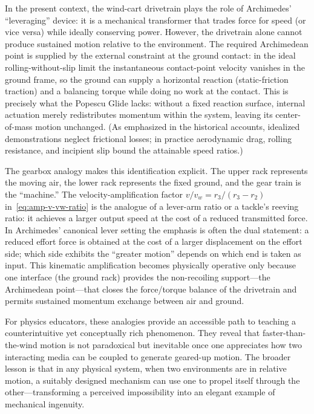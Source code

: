 \documentclass[reprint,aps,pra,longbibliography]{revtex4-2}
\begin{document}
In the present context, the wind-cart drivetrain plays the role of Archimedes'
``leveraging'' device: it is a mechanical transformer that trades force for
speed (or vice versa) while ideally conserving power. However, the drivetrain
alone cannot produce sustained motion relative to the environment. The required
Archimedean point is supplied by the external constraint at the ground contact:
in the ideal rolling-without-slip limit the instantaneous contact-point
velocity vanishes in the ground frame, so the ground can supply a horizontal
reaction (static-friction traction) and a balancing torque while doing no work
at the contact. This is precisely what the Popescu Glide lacks: without a fixed
reaction surface, internal actuation merely redistributes momentum within the
system, leaving its center-of-mass motion unchanged. (As emphasized in the
historical accounts, idealized demonstrations neglect frictional losses; in
practice aerodynamic drag, rolling resistance, and incipient slip bound the
attainable speed ratios.)

The gearbox analogy makes this identification explicit. The upper rack
represents the moving air, the lower rack represents the fixed ground, and the
gear train is the ``machine.'' The velocity-amplification factor
$v/v_w = r_3/(r_3-r_2)$ in~\eqref{eq:amp-v-vw-ratio} is the analogue of a lever-arm ratio or a tackle's
reeving ratio: it achieves a larger output speed at the cost of a reduced
transmitted force. In Archimedes' canonical lever setting the emphasis is
often the dual statement: a reduced effort force is obtained at the cost of a
larger displacement on the effort side; which side exhibits the ``greater
motion'' depends on which end is taken as input. This kinematic amplification
becomes physically operative only because one interface (the ground rack)
provides the non-recoiling support---the Archimedean point---that closes the
force/torque balance of the drivetrain and permits sustained momentum exchange
between air and ground.

For physics educators, these analogies provide an accessible path to teaching a
counterintuitive yet conceptually rich phenomenon. They reveal that
faster-than-the-wind motion is not paradoxical but inevitable once one
appreciates how two interacting media can be coupled to generate geared-up
motion. The broader lesson is that in any physical system, when two
environments are in relative motion, a suitably designed mechanism can use one
to propel itself through the other---transforming a perceived impossibility
into an elegant example of mechanical ingenuity.
\end{document}
